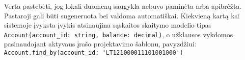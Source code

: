 Verta pastebėti, jog lokali duomenų saugykla nebuvo paminėta arba apibrėžta. Pastaroji gali būti sugeneruota bei valdoma automatiškai. Kiekvieną kartą kai sistemoje įvyksta įvykis atsinaujina sąskaitos skaitymo modelio tipas \lstinline|Account(account_id: string, balance: decimal)|, o užklausos vykdomos pasinaudojant aktyvaus įrašo projektavimo šablonu, pavyzdžiui: \lstinline|Account.find_by(account_id: 'LT121000011101001000')|






